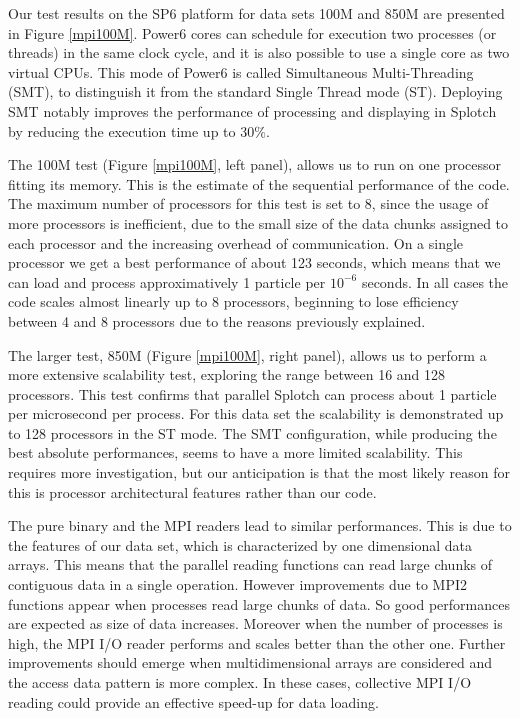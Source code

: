 \documentclass[1p,times]{elsarticle}
\begin{document}
Our test results on the SP6 platform for data sets 100M and 850M
are presented in Figure \ref{mpi100M}.
Power6 cores can schedule for execution two processes (or threads) in the same clock cycle, 
and it is also possible to use a single core as two virtual CPUs. This mode of Power6 
is called Simultaneous Multi-Threading (SMT), to distinguish it from 
the standard Single Thread mode (ST).
Deploying SMT notably improves the performance 
of processing and displaying in Splotch by reducing the execution time up to  
$30\%$.

The 100M test (Figure \ref{mpi100M}, left panel), allows us 
to run on one processor fitting its memory. 
This is the estimate of the sequential performance of the code. 
The maximum number of processors for this test is set to 8, since the usage of 
more processors is inefficient, due to the small size 
of the data chunks assigned to each processor and the increasing overhead of communication.
On a single processor we get a best performance of about 123 seconds, which means that 
we can load and process approximatively 1 particle per $10^{-6}$ seconds. 
In all cases the code scales almost linearly up to 8 processors, beginning to lose
efficiency between 4 and 8 processors due to the reasons previously explained. 

The larger test, 850M (Figure \ref{mpi100M}, right panel), 
allows us to perform a more extensive scalability test, 
exploring the range between 16 and 128 processors. This test confirms that parallel
Splotch can process about 1 particle per microsecond per process. For this data set the scalability
is demonstrated up to 128 processors in the ST mode. The SMT configuration,
while producing the best absolute performances, seems to have a more limited scalability. 
This requires more investigation, but our anticipation is that the most likely reason for this is processor 
architectural features rather than our code.

The pure binary and the MPI readers lead to similar performances. This is due to the features 
of our data set, which is characterized by one dimensional data arrays. This means
that the parallel reading functions can read large chunks of contiguous data 
in a single operation. However improvements due to MPI2 functions appear when 
processes read large chunks of data. So good performances are expected as size of data increases. 
Moreover when the number of processes is high, the MPI I/O reader performs and scales 
better than the other one. Further improvements should emerge when multidimensional 
arrays are considered and the access data pattern is more complex. 
In these cases, collective MPI I/O reading could provide an effective speed-up for data loading.
\end{document}
